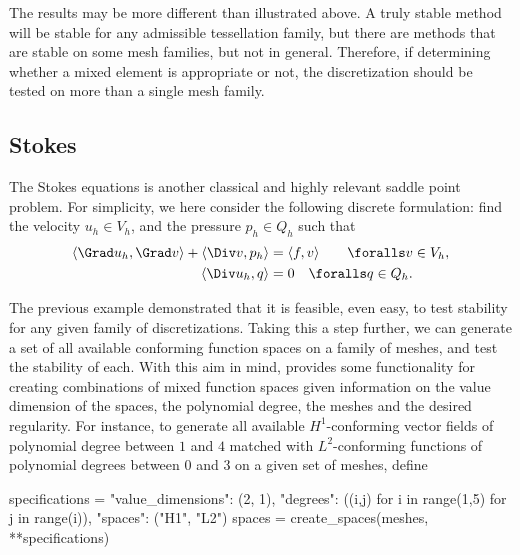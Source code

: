 The results may be more different than illustrated above. A truly
stable method will be stable for any admissible tessellation family,
but there are methods that are stable on some mesh families, but not
in general.  Therefore, if determining whether a mixed element is
appropriate or not, the discretization should be tested on more than a
single mesh family.

\subsection{Stokes}

The Stokes equations is another classical and highly relevant saddle
point problem. For simplicity, we here consider the following discrete
formulation: find the velocity $u_h \in V_h$, and the pressure $p_h
\in Q_h$ such that
\begin{equation}
  \label{rognes:eq:stokes}
  \begin{split}
    \langle \Grad u_h, \Grad v \rangle + \langle \Div v, p_h \rangle &=
    \langle f, v \rangle
    \quad\quad \foralls v \in V_h, \\
    \langle \Div u_h, q \rangle &= 0
    \quad \foralls q \in Q_h.
  \end{split}
\end{equation}

The previous example demonstrated that it is feasible, even easy, to
test stability for any given family of discretizations. Taking this a
step further, we can generate a set of all available conforming
function spaces on a family of meshes, and test the stability of
each. With this aim in mind, \rognesascot{} provides some
functionality for creating combinations of mixed function spaces given
information on the value dimension of the spaces, the polynomial
degree, the meshes and the desired regularity. For instance, to
generate all available $H^1$-conforming vector fields of polynomial
degree between $1$ and $4$ matched with $L^2$-conforming functions of
polynomial degrees between $0$ and $3$ on a given set of meshes,
define
\begin{python}
  specifications = {"value_dimensions": (2, 1),
                    "degrees": ((i,j) for i in range(1,5) for j in range(i)),
                    "spaces": ("H1", "L2")}
  spaces = create_spaces(meshes, **specifications)
\end{python}

